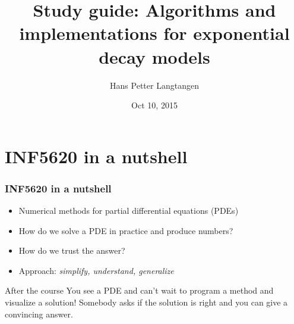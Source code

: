 \documentclass{beamer}
\begin{document}








\title{Study guide: Algorithms and implementations for exponential decay models}


\author{Hans Petter Langtangen}

\date{Oct 10, 2015
}

\begin{frame}
\titlepage
\end{frame}

\section{INF5620 in a nutshell}

\begin{frame}
\frametitle{INF5620 in a nutshell}

\label{5620:about}

\begin{itemize}
 \item Numerical methods for partial differential equations (PDEs)

 \item How do we solve a PDE in practice and produce numbers?

 \item How do we trust the answer?

 \item Approach: \emph{simplify, understand, generalize}
\end{itemize}

\noindent
\begin{block}{After the course }
You see a PDE and can't wait to program a method
and visualize a solution! Somebody asks if the solution is right
and you can give a convincing answer.
\end{block}


\end{frame}
\end{document}
